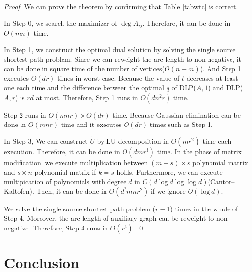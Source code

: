 \begin{proof}
We can prove the theorem by confirming that Table \ref{tabwtc} is correct.

In Step 0, we search the maximizer of $ \deg A_{ij} $. 
Therefore, it can be done in $ O (mn) $ time.

In Step 1, we construct the optimal dual solution 
by solving the single source shortest path problem. 
Since we can reweight the arc length to non-negative, 
it can be done in square time of the number of vertices($O(n+m)$).
And Step 1 executes $ O (dr) $ times in worst case. 
Because the value of $t$ decreases at least one each time and the difference between the optimal $q$ of DLP($A,1$) and DLP($A,r$) is $ r d $ at most.
Therefore, Step 1 runs in $ O (dn^2 r) $ time.

Step 2 runs in $ O ( mnr ) \times O(dr) $ time. 
Because Gaussian elimination can be done in $ O(mnr) $ time 
and it executes $ O(dr) $ times such as Step 1.

In Step 3, We can construct $ \tilde{U} $ by LU decomposition in $O(mr^2)$ time each execution. 
Therefore, it can be done in $ O (dmr^3)$ time. 
In the phase of matrix modification, 
we execute multiplication between $ ( m - s) \times s $ polynomial matrix 
and $ s \times n $ polynomial matrix if $ k = s $ holds. 
Furthermore, we can execute multipication of polynomials with degree $d$ 
in $ O ( d \log d \log \log d ) $(Cantor--Kaltofen\cite{FMP}). 
Then, it can be done in $ O ( d^2 mnr^2 ) $ if we ignore $ O (\log d ) $. 

We solve the single source shortest path problem ($ r -1 $) times in the whole of Step 4. 
Moreover, the arc length of auxiliary graph can be reweight to non-negative.
Therefore, Step 4 runs in $ O(r^3)$. \qed
\end{proof}

\section{Conclusion}
\label{conc}


